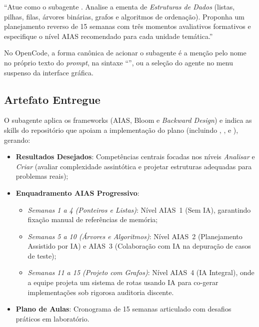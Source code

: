 \begin{tcolorbox}[colback=white, colframe=boxborder, arc=1mm, title={Comando Enviado pelo Professor}]
\small
``Atue como o subagente . Analise a ementa de \emph{Estruturas de Dados} (listas, pilhas, filas, {\'a}rvores bin{\'a}rias, grafos e algoritmos de ordena{\c c}{\~a}o). Proponha um planejamento reverso de 15 semanas com tr{\^e}s momentos avaliativos formativos e especifique o n{\'i}vel AIAS recomendado para cada unidade tem{\'a}tica.''
\end{tcolorbox}

No OpenCode, a forma can{\^o}nica de acionar o subagente {\'e} a men{\c c}{\~a}o pelo nome no pr{\'o}prio texto do \emph{prompt}, na sintaxe ``'', ou a sele{\c c}{\~a}o do agente no menu suspenso da interface gr{\'a}fica.

\subsection{Artefato Entregue}
O subagente aplica os frameworks (AIAS, Bloom e \emph{Backward Design}) e indica as skills do reposit{\'o}rio que apoiam a implementa{\c c}{\~a}o do plano (incluindo , ,  e ), gerando:
\begin{itemize}
  \item \textbf{Resultados Desejados}: Compet{\^e}ncias centrais focadas nos n{\'i}veis \emph{Analisar} e \emph{Criar} (avaliar complexidade assint{\'o}tica e projetar estruturas adequadas para problemas reais);
  \item \textbf{Enquadramento AIAS Progressivo}:
    \begin{itemize}
      \item \emph{Semanas 1 a 4 (Ponteiros e Listas)}: N{\'i}vel AIAS~1 (Sem IA), garantindo fixa{\c c}{\~a}o manual de refer{\^e}ncias de mem{\'o}ria;
      \item \emph{Semanas 5 a 10 ({\'A}rvores e Algoritmos)}: N{\'i}vel AIAS~2 (Planejamento Assistido por IA) e AIAS~3 (Colabora{\c c}{\~a}o com IA na depura{\c c}{\~a}o de casos de teste);
      \item \emph{Semanas 11 a 15 (Projeto com Grafos)}: N{\'i}vel AIAS~4 (IA Integral), onde a equipe projeta um sistema de rotas usando IA para co-gerar implementa{\c c}{\~o}es sob rigorosa auditoria discente.
    \end{itemize}
  \item \textbf{Plano de Aulas}: Cronograma de 15 semanas articulado com desafios pr{\'a}ticos em laborat{\'o}rio.
\end{itemize}

